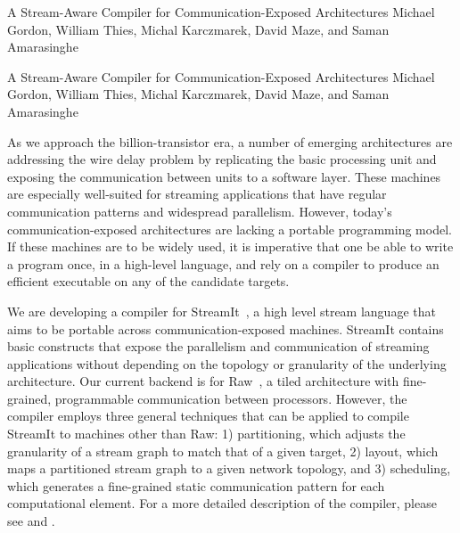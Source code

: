 

\formattitle%
  {A Stream-Aware Compiler for Communication-Exposed 
   Architectures}
  {Michael Gordon, William Thies, Michal Karczmarek, David Maze, and
  Saman Amarasinghe}

\formatcontents%
  {A Stream-Aware Compiler for Communication-Exposed 
  Architectures}
  {Michael Gordon, William Thies, Michal Karczmarek, David Maze, and
  Saman Amarasinghe}

%

As we approach the billion-transistor era, a number of emerging
architectures are addressing the wire delay problem by replicating the
basic processing unit and exposing the communication between units to
a software layer.  These machines are especially well-suited for
streaming applications that have regular communication patterns and
widespread parallelism.  However, today's communication-exposed
architectures are lacking a portable programming model.  If these
machines are to be widely used, it is imperative that one be able to
write a program once, in a high-level language, and rely on a compiler
to produce an efficient executable on any of the candidate targets.

We are developing a compiler for StreamIt~\cite{streamitcc}, a high
level stream language that aims to be portable across
communication-exposed machines.  StreamIt contains basic constructs
that expose the parallelism and communication of streaming
applications without depending on the topology or granularity of the
underlying architecture.  Our current backend is for Raw~\cite{raw}, a
tiled architecture with fine-grained, programmable communication
between processors.  However, the compiler employs three general
techniques that can be applied to compile StreamIt to machines other
than Raw: 1) partitioning, which adjusts the granularity of a stream
graph to match that of a given target, 2) layout, which maps a
partitioned stream graph to a given network topology, and 3)
scheduling, which generates a fine-grained static communication
pattern for each computational element.  For a more detailed
description of the compiler, please see
\cite{streamit-asplos} and \cite{mgordon-thesis}.

